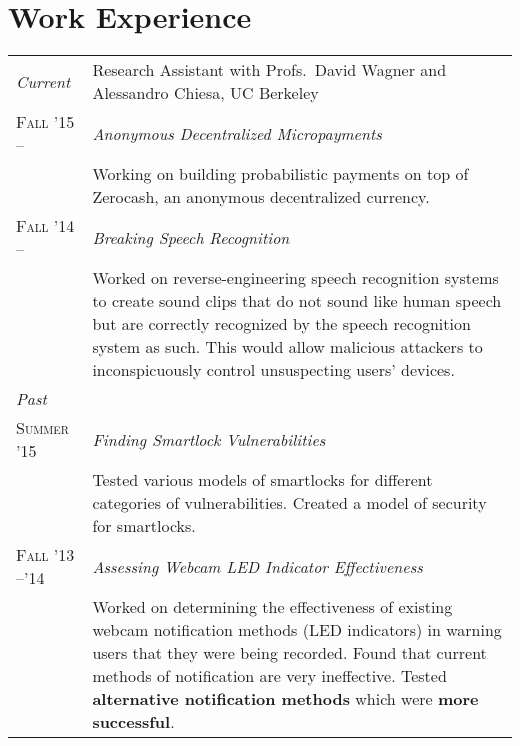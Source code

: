 \documentclass[10pt]{article}
\begin{document}
\section{Work Experience}
\begin{tabular}{R{2.5cm}p{13cm}}

  \emph{Current}          & Research Assistant with Profs.\ David Wagner and
                            Alessandro Chiesa, UC Berkeley\\
  \textsc{Fall '15 --} & \emph{Anonymous Decentralized Micropayments}\\
                       & \footnotesize{%
                            Working on building probabilistic payments on top of
                            Zerocash, an anonymous decentralized currency.
                            }\\
  \textsc{Fall '14 --} & \emph{Breaking Speech Recognition}\\

                          &\footnotesize{%
                             Worked on reverse-engineering speech recognition
                             systems to create sound clips that do not sound
                             like human speech but are correctly recognized by
                             the speech recognition system as such. This would
                             allow malicious attackers to inconspicuously
                             control unsuspecting users’ devices.
                            }\\

  \emph{Past}             &\\
  \textsc{Summer '15}     & \emph{Finding Smartlock Vulnerabilities}\\

                          &\footnotesize{%
                             Tested various models of smartlocks for different
                             categories of vulnerabilities. Created a model of
                             security for smartlocks.

                            }\\
  \textsc{Fall '13 --'14} & \emph{Assessing Webcam LED Indicator Effectiveness}\\

                          &\footnotesize{%
                             Worked on determining the effectiveness of
                             existing webcam notification methods (LED
                             indicators) in warning users that they were being
                             recorded. Found that current methods of
                             notification are very ineffective. Tested
                             \textbf{alternative notification methods} which
                             were \textbf{more successful}.

}
\end{tabular}
\end{document}
